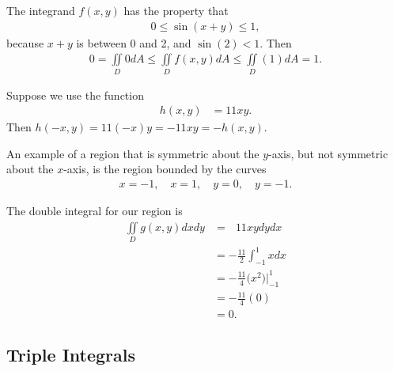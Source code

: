 \item %
The integrand $f(x,y)$ has the property that 
\begin{align*}
  0 \le \sin(x+y) \le 1,
\end{align*}
because $x+y$ is between 0 and 2, and $\sin(2) < 1$. Then 
\begin{align*}
  0 = \iint\limits_D 0 dA  \le  \iint\limits_D f(x,y) dA \le  \iint\limits_D (1) dA = 1.
\end{align*}
\item %
\BEN
\item 
Suppose we use the function
\begin{align*}
 h(x,y) & = 11xy.
\end{align*}
Then $h(-x,y) = 11(-x)y = -11xy = -h(x,y)$. 
\item An example of a region that is symmetric about the $y$-axis, but not symmetric about the $x$-axis, is the region bounded by the curves
\begin{align*}
  x = -1,  \quad x = 1, \quad y = 0, \quad y = - 1.
\end{align*}
\item The double integral for our region is
\begin{align*}
  \iint\limits_D g(x,y) dxdy 
  &=  \mathop{\int_{-1}^1 \! \int_{-1}^0} 11xy dydx\\
  &=  -\frac{11}{2} \int_{-1}^1 x dx\\
  &=  -\frac{11}{4} \Big(x^2 \Big)\Big|_{-1}^{1} \\
  &=  -\frac{11}{4} (0)\\
  &= 0.
\end{align*}
\EEN
\EEN %
\subsection{Triple Integrals}

